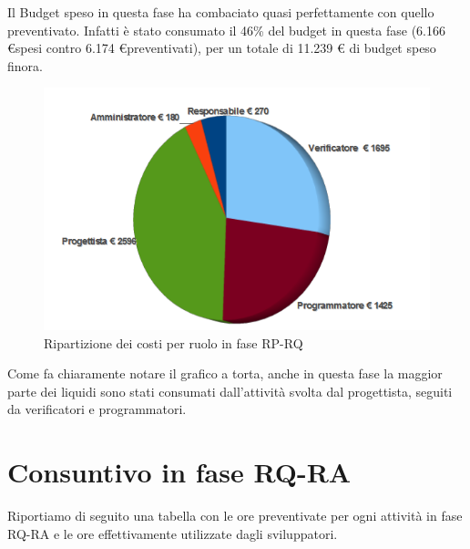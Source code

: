 Il Budget speso in questa fase ha combaciato quasi perfettamente con quello
preventivato. Infatti \`e stato consumato il 46\% del budget in questa fase
(6.166 \euro spesi contro 6.174 \euro preventivati), per un totale di 11.239 \euro
di budget speso finora.

\newpage
\vspace{0cm}
\begin{figure}[htbp!]
  \centering
  \includegraphics[width=13cm, angle=0]{img/PP/COSTI-RQ.png}
\caption{Ripartizione dei costi per ruolo in fase RP-RQ}
\end{figure}
\vspace{0.5cm}


Come fa chiaramente notare il grafico a torta, anche in questa fase la maggior
parte dei liquidi sono stati consumati dall'attivit\`a svolta dal progettista,
seguiti da verificatori e programmatori.

\newpage
\section{Consuntivo in fase RQ-RA}

Riportiamo di seguito una tabella con le ore preventivate per ogni attivit\`a
in fase RQ-RA e le ore effettivamente utilizzate dagli sviluppatori.

